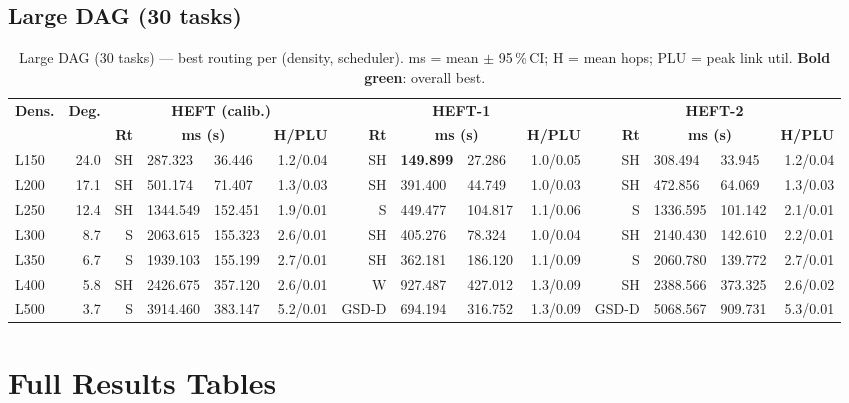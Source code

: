 \documentclass[11pt]{article}
\newcommand{\win}[1]{\textcolor{green!50!black}{\textbf{#1}}}
\begin{document}
\subsection{Large DAG (30 tasks)}
\begin{table}[H]\centering\small
\begin{tabular}{l r r@{\,}l@{$\pm$}l@{\,}r r@{\,}l@{$\pm$}l@{\,}r r@{\,}l@{$\pm$}l@{\,}r}
\toprule
\textbf{Dens.} & \textbf{Deg.} & \multicolumn{4}{c}{\textbf{HEFT (calib.)}} & \multicolumn{4}{c}{\textbf{HEFT-1}} & \multicolumn{4}{c}{\textbf{HEFT-2}} \\
\cmidrule(lr){3-6}\cmidrule(lr){7-10}\cmidrule(lr){11-14}
& & \textbf{Rt} & \multicolumn{2}{c}{\textbf{ms (s)}} & \textbf{H/PLU} & \textbf{Rt} & \multicolumn{2}{c}{\textbf{ms (s)}} & \textbf{H/PLU} & \textbf{Rt} & \multicolumn{2}{c}{\textbf{ms (s)}} & \textbf{H/PLU} \\
\midrule
  L150 & 24.0 & SH & 287.323 & 36.446 & 1.2/0.04 & SH & \win{149.899} & 27.286 & 1.0/0.05 & SH & 308.494 & 33.945 & 1.2/0.04 \\
  L200 & 17.1 & SH & 501.174 & 71.407 & 1.3/0.03 & SH & 391.400 & 44.749 & 1.0/0.03 & SH & 472.856 & 64.069 & 1.3/0.03 \\
  L250 & 12.4 & SH & 1344.549 & 152.451 & 1.9/0.01 & S & 449.477 & 104.817 & 1.1/0.06 & S & 1336.595 & 101.142 & 2.1/0.01 \\
  L300 & 8.7 & S & 2063.615 & 155.323 & 2.6/0.01 & SH & 405.276 & 78.324 & 1.0/0.04 & SH & 2140.430 & 142.610 & 2.2/0.01 \\
  L350 & 6.7 & S & 1939.103 & 155.199 & 2.7/0.01 & SH & 362.181 & 186.120 & 1.1/0.09 & S & 2060.780 & 139.772 & 2.7/0.01 \\
  L400 & 5.8 & SH & 2426.675 & 357.120 & 2.6/0.01 & W & 927.487 & 427.012 & 1.3/0.09 & SH & 2388.566 & 373.325 & 2.6/0.02 \\
  L500 & 3.7 & S & 3914.460 & 383.147 & 5.2/0.01 & GSD-D & 694.194 & 316.752 & 1.3/0.09 & GSD-D & 5068.567 & 909.731 & 5.3/0.01 \\
\bottomrule\end{tabular}
\caption{Large DAG (30 tasks) --- best routing per (density, scheduler). ms = mean $\pm$ 95\,\%\,CI; H = mean hops; PLU = peak link util. \win{Bold green}: overall best.}
\end{table}

\section{Full Results Tables}
\end{document}
